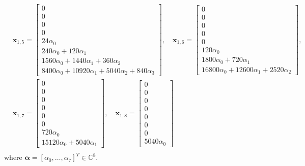 \begin{displaymath}
\begin{split}
&\boldsymbol{x}_{1,5} = \left[\begin{matrix}0\\0\\0\\0\\24 \alpha_{0}\\240 \alpha_{0} + 120 \alpha_{1}\\1560 \alpha_{0} + 1440 \alpha_{1} + 360 \alpha_{2}\\8400 \alpha_{0} + 10920 \alpha_{1} + 5040 \alpha_{2} + 840 \alpha_{3}\end{matrix}\right], \quad \boldsymbol{x}_{1,6} = \left[\begin{matrix}0\\0\\0\\0\\0\\120 \alpha_{0}\\1800 \alpha_{0} + 720 \alpha_{1}\\16800 \alpha_{0} + 12600 \alpha_{1} + 2520 \alpha_{2}\end{matrix}\right], \\
&\boldsymbol{x}_{1,7} = \left[\begin{matrix}0\\0\\0\\0\\0\\0\\720 \alpha_{0}\\15120 \alpha_{0} + 5040 \alpha_{1}\end{matrix}\right], \quad \boldsymbol{x}_{1,8} = \left[\begin{matrix}0\\0\\0\\0\\0\\0\\0\\5040 \alpha_{0}\end{matrix}\right]\\
\end{split}
\end{displaymath}
where $\boldsymbol{\alpha} = [\alpha_{0}, \ldots, \alpha_{7}]^{T} \in \mathbb{C}^{8}$.


